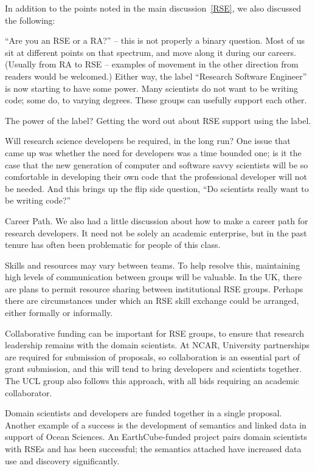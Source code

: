In addition to the points noted in the main discussion~\ref{RSE}, we also
discussed the following:

``Are you an RSE or a RA?'' -- this is not properly a binary question. Most of
us sit at different points on that spectrum, and move along it during our
careers. (Usually from RA to RSE -- examples of movement in the other direction
from readers would be welcomed.)
Either way, the label ``Research Software Engineer'' is now starting to
have some power. Many scientists do not want to be writing code; some do, to
varying degrees. These groups can usefully support each other.

The power of the label? Getting the word out about RSE support using the label.

Will research science developers be required, in the long run?
One issue that came up was whether the need for developers was a time bounded one; is it the case that the new generation of computer and software savvy scientists will be so comfortable in developing their own code that the professional developer will not be needed. And this brings up the flip side question, ``Do scientists really want to be writing code?''

Career Path.
We also had a little discussion about how to make a career path for research developers. It need not be solely an academic enterprise, but in the past tenure has often been problematic for people of this class.

Skills and resources may vary between teams. To help resolve this, maintaining
high levels of communication between groups will be valuable. In the UK, there
are plans to permit resource sharing between institutional RSE groups. Perhaps 
there are circumstances under which an RSE skill exchange could be arranged, either
formally or informally. 

Collaborative funding can be important for RSE groups, to ensure that research
leadership remains with the domain scientists. At NCAR, University partnerships
are required for submission of proposals, so collaboration is an essential part
of grant submission, and this will tend to bring developers and
scientists together. The UCL group also follows this approach, with all bids
requiring an academic collaborator.

Domain scientists and developers are funded together in a single proposal.
Another example of a success is the development of semantics and linked data in
support of Ocean Sciences. An EarthCube-funded project pairs domain scientists
with RSEs and has been successful; the semantics attached have increased data
use and discovery significantly.

